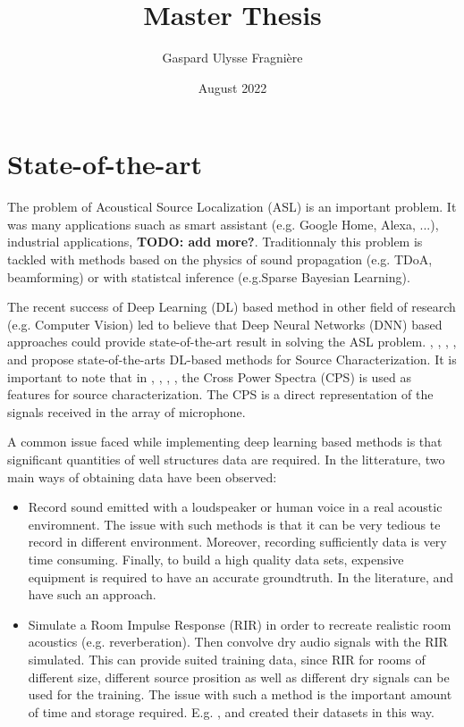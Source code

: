 \documentclass{article}
\title{Master Thesis}
\author{Gaspard Ulysse Fragnière}
\date{August 2022}
\begin{document}
\maketitle

\section{State-of-the-art}

The problem of Acoustical Source Localization (ASL) is an important problem. It was many applications suach as smart assistant (e.g. Google Home, Alexa, ...), industrial applications, \textbf{TODO: add more?}. Traditionnaly this problem is tackled with methods based on the physics of sound propagation (e.g. TDoA, beamforming) or with statistcal inference (e.g.Sparse Bayesian Learning). 

The recent success of Deep Learning (DL) based method in other field of research (e.g. Computer Vision) led to believe that Deep Neural Networks (DNN) based approaches could provide state-of-the-art result in solving the ASL problem. \cite{castellini2021neural}, \cite{kujawski2019deep}, \cite{lee2021deep}, \cite{ma2019phased}, \cite{pinto2021deconvoluting} and \cite{xu2021deep} propose state-of-the-arts DL-based methods for Source Characterization. It is important to note that in \cite{castellini2021neural}, \cite{lee2021deep}, \cite{ma2019phased}, \cite{xu2021deep}, the Cross Power Spectra (CPS) is used as features for source characterization. The CPS is a direct representation of the signals received in the array of microphone.

A common issue faced while implementing deep learning based methods is that significant quantities of well structures data are required. In the litterature, two main ways of obtaining data have been observed:

\begin{itemize}
    \item Record sound emitted with a loudspeaker or human voice in a real acoustic enviromnent. The issue with such methods is that it can be very tedious te record in different environment. Moreover, recording sufficiently data is very time consuming. Finally, to build a high quality data sets, expensive equipment is required to have an accurate groundtruth. In the literature, \cite{he2018deep} and \cite{ferguson2018sound} have such an approach.
    \item Simulate a Room Impulse Response (RIR) in order to recreate realistic room acoustics (e.g. reverberation). Then convolve dry audio signals with the RIR simulated. This can provide suited training data, since RIR for rooms of different size, different source prosition as well as different dry signals can be used for the training. The issue with such a method is the important amount of time and storage required. E.g. \cite{chakrabarty2017broadband}, \cite{perotin2018crnn} and \cite{adavanne2018direction} created their datasets in this way.
\end{itemize}
\end{document}
